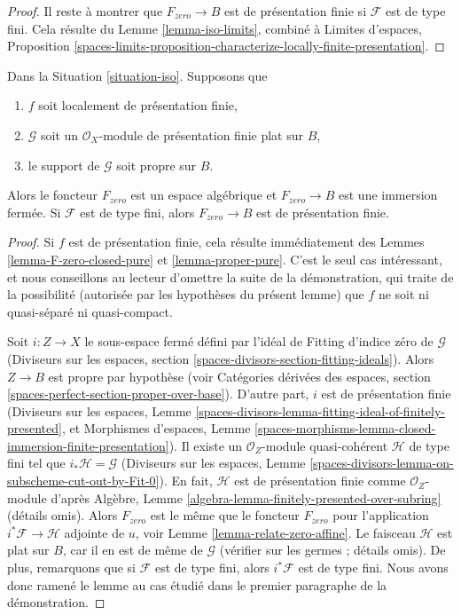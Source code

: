\begin{proof}
\medskip\noindent
Il reste à montrer que $F_{zero} \to B$ est de présentation finie si
$\mathcal{F}$ est de type fini. Cela résulte du
Lemme \ref{lemma-iso-limits}, combiné à
Limites d'espaces, Proposition
\ref{spaces-limits-proposition-characterize-locally-finite-presentation}.
\end{proof}

\begin{lemma}
\label{lemma-F-zero-closed-proper}
Dans la Situation \ref{situation-iso}. Supposons que
\begin{enumerate}
\item $f$ soit localement de présentation finie,
\item $\mathcal{G}$ soit un $\mathcal{O}_X$-module de présentation finie
plat sur $B$,
\item le support de $\mathcal{G}$ soit propre sur $B$.
\end{enumerate}
Alors le foncteur $F_{zero}$ est un espace algébrique et $F_{zero} \to B$
est une immersion fermée. Si $\mathcal{F}$ est de type fini, alors
$F_{zero} \to B$ est de présentation finie.
\end{lemma}

\begin{proof}
Si $f$ est de présentation finie, cela résulte immédiatement des
Lemmes \ref{lemma-F-zero-closed-pure} et \ref{lemma-proper-pure}.
C'est le seul cas intéressant, et nous conseillons au lecteur d'omettre
la suite de la démonstration, qui traite de la possibilité (autorisée
par les hypothèses du présent lemme)
que $f$ ne soit ni quasi-séparé ni quasi-compact.

\medskip\noindent
Soit $i : Z \to X$ le sous-espace fermé défini par l'idéal de Fitting
d'indice zéro de $\mathcal{G}$
(Diviseurs sur les espaces, section
\ref{spaces-divisors-section-fitting-ideals}).
Alors $Z \to B$ est propre par hypothèse (voir
Catégories dérivées des espaces, section
\ref{spaces-perfect-section-proper-over-base}).
D'autre part, $i$ est de présentation finie
(Diviseurs sur les espaces, Lemme
\ref{spaces-divisors-lemma-fitting-ideal-of-finitely-presented}, et
Morphismes d'espaces, Lemme
\ref{spaces-morphisms-lemma-closed-immersion-finite-presentation}).
Il existe un $\mathcal{O}_Z$-module quasi-cohérent
$\mathcal{H}$ de type fini tel que $i_*\mathcal{H} = \mathcal{G}$
(Diviseurs sur les espaces, Lemme
\ref{spaces-divisors-lemma-on-subscheme-cut-out-by-Fit-0}).
En fait, $\mathcal{H}$ est de présentation finie comme $\mathcal{O}_Z$-module
d'après Algèbre, Lemme \ref{algebra-lemma-finitely-presented-over-subring}
(détails omis).
Alors $F_{zero}$ est le même que le foncteur $F_{zero}$
pour l'application $i^*\mathcal{F} \to \mathcal{H}$ adjointe de $u$, voir
Lemme \ref{lemma-relate-zero-affine}.
Le faisceau $\mathcal{H}$ est plat sur $B$, car
il en est de même de $\mathcal{G}$ (vérifier sur les germes ; détails omis).
De plus, remarquons que si $\mathcal{F}$ est de type fini,
alors $i^*\mathcal{F}$ est de type fini.
Nous avons donc ramené le lemme au cas
étudié dans le premier paragraphe de la démonstration.
\end{proof}








